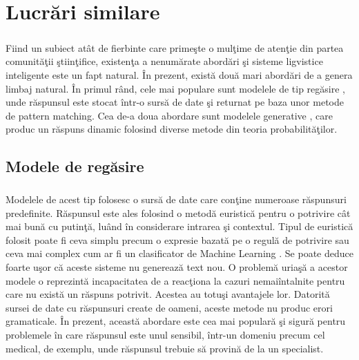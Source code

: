 \chapter{Lucr\u ari similare}

\paragraph{}
Fiind un subiect at\^ at de fierbinte care prime\c ste o mul\c time de aten\c tie din partea comunit\u a\c tii \c stiin\c tifice, existen\c ta a nenum\u arate abord\u ari \c si sisteme ligvistice inteligente este un fapt natural. \^ In prezent, exist\u a dou\u a mari abord\u ari de a genera limbaj natural. \^ In primul r\^ and, cele mai populare sunt modelele de tip reg\u asire \cite{chatbot-models}, unde r\u aspunsul este stocat \^ intr-o surs\u a de date \c si returnat pe baza unor metode de pattern matching. Cea de-a doua abordare sunt modelele generative \cite{chatbot-models}, care produc un r\u aspuns dinamic folosind diverse metode din teoria probabilit\u a\c tilor.

\section{Modele de reg\u asire}

\paragraph{}
Modelele de acest tip folosesc o surs\u a de date care con\c tine numeroase r\u aspunsuri predefinite. R\u aspunsul este ales folosind o metod\u a euristic\u a pentru o potrivire c\^ at mai bun\u a cu putin\c t\u a, lu\^ and \^ in considerare intrarea \c si contextul. Tipul de euristic\u a folosit poate fi ceva simplu precum o expresie bazat\u a pe o regul\u a de potrivire sau ceva mai complex cum ar fi un clasificator de Machine Learning \cite{retrieval-chatbots}. Se poate deduce foarte u\c sor c\u a aceste sisteme nu genereaz\u a text nou. O problem\u a uria\c s\u a a acestor modele o reprezint\u a incapacitatea de a reac\c tiona la cazuri nemai\^ intalnite pentru care nu exist\u a un r\u aspuns potrivit. Acestea au totu\c si avantajele lor. Datorit\u a sursei de date cu r\u aspunsuri create de oameni, aceste metode nu produc erori gramaticale. \^ In prezent, aceast\u a abordare este cea mai popular\u a \c si sigur\u a pentru problemele \^ in care r\u aspunsul este unul sensibil, \^ intr-un domeniu precum cel medical, de exemplu, unde r\u aspunsul trebuie s\u a provin\u a de la un specialist.


